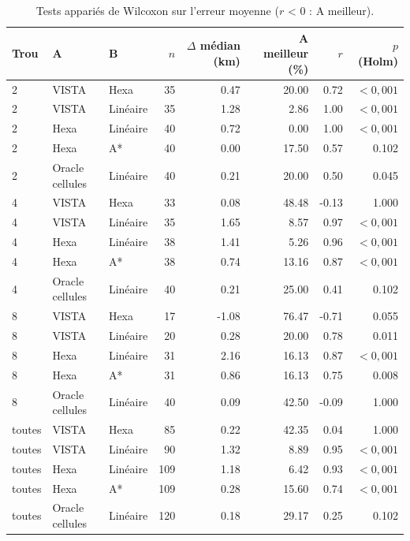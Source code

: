 \begin{table}[t]
\centering\small
\begin{tabular}{lllrrrrr}
\toprule
Trou & A & B & $n$ & $\Delta$ médian (km) & A meilleur (\%) & $r$ & $p$ (Holm) \\
\midrule
2 & VISTA & Hexa & 35 & 0.47 & 20.00 & 0.72 & $<0{,}001$ \\
2 & VISTA & Linéaire & 35 & 1.28 & 2.86 & 1.00 & $<0{,}001$ \\
2 & Hexa & Linéaire & 40 & 0.72 & 0.00 & 1.00 & $<0{,}001$ \\
2 & Hexa & A* & 40 & 0.00 & 17.50 & 0.57 & 0.102 \\
2 & Oracle cellules & Linéaire & 40 & 0.21 & 20.00 & 0.50 & 0.045 \\
4 & VISTA & Hexa & 33 & 0.08 & 48.48 & -0.13 & 1.000 \\
4 & VISTA & Linéaire & 35 & 1.65 & 8.57 & 0.97 & $<0{,}001$ \\
4 & Hexa & Linéaire & 38 & 1.41 & 5.26 & 0.96 & $<0{,}001$ \\
4 & Hexa & A* & 38 & 0.74 & 13.16 & 0.87 & $<0{,}001$ \\
4 & Oracle cellules & Linéaire & 40 & 0.21 & 25.00 & 0.41 & 0.102 \\
8 & VISTA & Hexa & 17 & -1.08 & 76.47 & -0.71 & 0.055 \\
8 & VISTA & Linéaire & 20 & 0.28 & 20.00 & 0.78 & 0.011 \\
8 & Hexa & Linéaire & 31 & 2.16 & 16.13 & 0.87 & $<0{,}001$ \\
8 & Hexa & A* & 31 & 0.86 & 16.13 & 0.75 & 0.008 \\
8 & Oracle cellules & Linéaire & 40 & 0.09 & 42.50 & -0.09 & 1.000 \\
toutes & VISTA & Hexa & 85 & 0.22 & 42.35 & 0.04 & 1.000 \\
toutes & VISTA & Linéaire & 90 & 1.32 & 8.89 & 0.95 & $<0{,}001$ \\
toutes & Hexa & Linéaire & 109 & 1.18 & 6.42 & 0.93 & $<0{,}001$ \\
toutes & Hexa & A* & 109 & 0.28 & 15.60 & 0.74 & $<0{,}001$ \\
toutes & Oracle cellules & Linéaire & 120 & 0.18 & 29.17 & 0.25 & 0.102 \\
\bottomrule
\end{tabular}
\caption{Tests appariés de Wilcoxon sur l'erreur moyenne ($r$ < 0 : A meilleur).}
\label{tab:tests}
\end{table}
